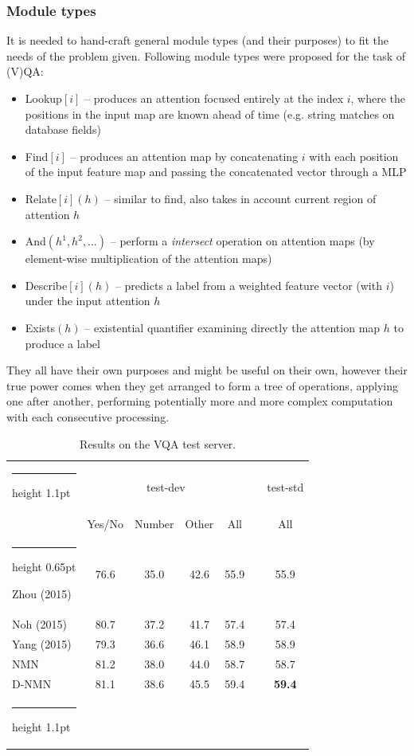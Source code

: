 \documentclass[a4paper,twocolumn]{article}
\makeatletter
\newcommand{\thickhline}{%
    \noalign {\ifnum 0=`}\fi \hrule height 1.1pt
    \futurelet \reserved@a \@xhline
}
\newcommand{\thickerhline}{%
    \noalign {\ifnum 0=`}\fi \hrule height 0.65pt
    \futurelet \reserved@a \@xhline
}
\makeatother
\begin{document}
\subsubsection*{Module types}
It is needed to hand-craft general module types (and their purposes) to fit the needs of the problem given. Following module types were proposed for the task of (V)QA:
    \begin{itemize}
        \item Lookup$[i]$ – produces an attention focused entirely at the index $i$, where the positions in the input map are known ahead of time (e.g. string matches on database fields)
        \item Find$[i]$ – produces an attention map by concatenating $i$ with each position of the input feature map and passing the concatenated vector through a MLP
        \item Relate$[i](h)$ – similar to find, also takes in account current region of attention $h$
        \item And$(h^1, h^2, \dots)$ – perform a \textit{intersect} operation on attention maps (by element-wise multiplication of the attention maps)
        \item Describe$[i](h)$ – predicts a label from a weighted feature vector (with $i$) under the input attention $h$
        \item Exists$(h)$ – existential quantifier examining directly the attention map $h$ to produce a label
    \end{itemize}
They all have their own purposes and might be useful on their own, however their true
power comes when they get arranged to form a tree of operations, applying one after another, performing potentially more and more complex computation with each consecutive processing.

{
\renewcommand{\arraystretch}{1.25}
\begin{table}[ht]
    \centering
    \begin{tabular}{l c c c c c c}
        \thickhline
        & \multicolumn{4}{c}{test-dev} && test-std \\
        \cline{2-5} \cline{7-5}
        & Yes/No & Number & Other & All && All \\
        \thickerhline
        Zhou (2015) & 76.6 & 35.0 & 42.6 & 55.9 && 55.9 \\
        Noh (2015)  & 80.7 & 37.2 & 41.7 & 57.4 && 57.4 \\
        Yang (2015) & 79.3 & 36.6 & 46.1 & 58.9 && 58.9 \\
        NMN         & 81.2 & 38.0 & 44.0 & 58.7 && 58.7 \\
        D-NMN       & 81.1 & 38.6 & 45.5 & 59.4 && \textbf{59.4} \\
        \thickhline
    \end{tabular}
    \caption{Results on the VQA test server.}
\end{table}
}
\end{document}

